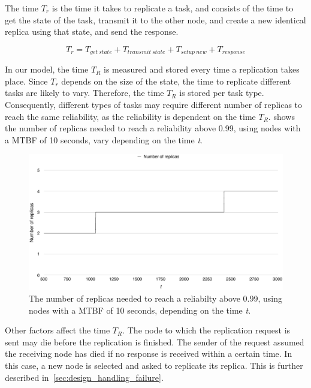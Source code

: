 \documentclass{cslthse-msc}
\begin{document}
The time $T_r$ is the time it takes to replicate a task, and consists of the time to get the state of the task, transmit it to the other node, and create a new identical replica using that state, and send the response. 

\begin{equation} \label{eq:replication_time}
T_{r} = T_{get\ state} + T_{transmit\ state} + T_{setup\ new} + T_{response}
\end{equation} 

In our model, the time $T_{R}$ is measured and stored every time a replication takes place. Since $T_{r}$ depends on the size of the state, the time to replicate different tasks are likely to vary. Therefore, the time $T_{R}$ is stored per task type. Consequently, different types of tasks may require different number of replicas to reach the same reliability, as the reliability is dependent on the time $T_R$.  shows the number of replicas needed to reach a reliability above 0.99, using nodes with a MTBF of 10 seconds, vary depending on the time \emph{t}.


\begin{figure}[!hbt]
\centering
\includegraphics[scale=0.5]{images/replicas_depending_on_t.pdf}
\caption{The number of replicas needed to reach a reliabilty above 0.99, using nodes with a MTBF of 10 seconds, depending on the time \emph{t}.}\label{fig:replicas_depending_on_t}
\end{figure}


Other factors affect the time $T_R$. The node to which the replication request is sent may die before the replication is finished. The sender of the request assumed the receiving node has died if no response is received within a certain time. In this case, a new node is selected and asked to replicate its replica. This is further described in~\cref{sec:design_handling_failure}. 
\end{document}

